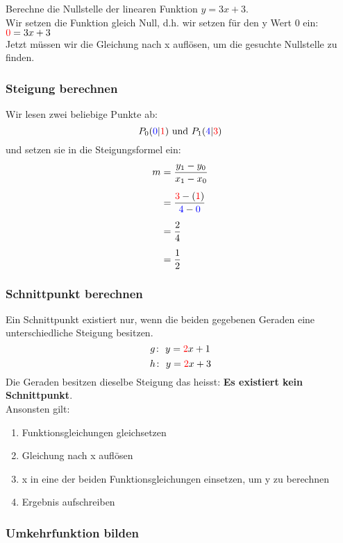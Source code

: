\begin{multicols}{2}
    Berechne die Nullstelle der linearen Funktion  $y = 3x + 3$. \\
    Wir setzen die Funktion gleich Null, d.h. wir setzen für den y Wert 0 ein: ${\color{red}{0}} = 3x + 3$ \\
    Jetzt müssen wir die Gleichung nach x auflösen, um die gesuchte Nullstelle zu finden.
    \subsubsection{Steigung berechnen}
    Wir lesen zwei beliebige Punkte ab:
    \[P_0({\color{blue}0}|{\color{red}1}) \text{ und } P_1({\color{blue}4}|{\color{red}3})\]
    und setzen sie in die Steigungsformel ein:
    \begin{align*} m &= \frac{y_1 - y_0}{x_1 - x_0} \\[5px] &= \frac{{\color{red}3} - ({\color{red}1})}{{\color{blue}4} - {\color{blue}0}}\\[5px] &= \frac{2}{4} \\[5px] &= \frac{1}{2} \end{align*}
    \subsubsection{Schnittpunkt berechnen}
    \vspace{-4mm}

    Ein Schnittpunkt existiert nur, wenn die beiden gegebenen Geraden eine unterschiedliche Steigung besitzen.
    \[g\colon~y = {\color{red}2}x + 1\]
    \[h\colon~y = {\color{red}2}x + 3\]
    Die Geraden besitzen dieselbe Steigung das heisst: \textbf{Es existiert kein Schnittpunkt}.\\
    Ansonsten gilt:
    \begin{enumerate}
        \item Funktionsgleichungen gleichsetzen
        \item Gleichung nach x auflösen
        \item x in eine der beiden Funktionsgleichungen einsetzen, um y zu berechnen
        \item Ergebnis aufschreiben
    \end{enumerate}

    \subsubsection{Umkehrfunktion bilden}
    \vspace{-4mm}


\end{multicols}
